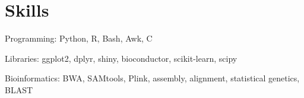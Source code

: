 \documentclass[letterpaper]{article}
\renewenvironment{itemize}{
  \begin{list}{}{
    \setlength{\leftmargin}{1em}
  }
}{
  \end{list}
}
\begin{document}
\section*{Skills}
\begin{itemize}
\item Programming: Python, R, Bash, Awk, C 
\item Libraries: ggplot2, dplyr, shiny, bioconductor, scikit-learn, scipy
\item Bioinformatics: BWA, SAMtools, Plink, assembly, alignment, statistical genetics, BLAST

\end{itemize}
\end{document}
